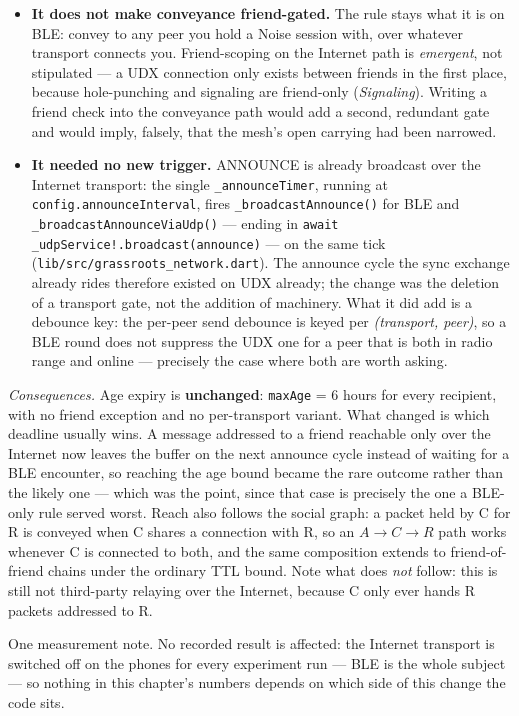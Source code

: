\documentclass[11pt]{report}
\newcommand{\code}[1]{\texttt{\small #1}}
\begin{document}
\begin{itemize}
  \item \textbf{It does not make conveyance friend-gated.} The rule stays what it is on BLE: convey to any peer you hold a Noise session with, over whatever transport connects you. Friend-scoping on the Internet path is \emph{emergent}, not stipulated --- a UDX connection only exists between friends in the first place, because hole-punching and signaling are friend-only (\emph{Signaling}). Writing a friend check into the conveyance path would add a second, redundant gate and would imply, falsely, that the mesh's open carrying had been narrowed.
  \item \textbf{It needed no new trigger.} ANNOUNCE is already broadcast over the Internet transport: the single \code{\_announceTimer}, running at \code{config.announceInterval}, fires \code{\_broadcastAnnounce()} for BLE and \code{\_broadcastAnnounceViaUdp()} --- ending in \code{await \_udpService!.broadcast(announce)} --- on the same tick (\code{lib/src/grassroots\_network.dart}). The announce cycle the sync exchange already rides therefore existed on UDX already; the change was the deletion of a transport gate, not the addition of machinery. What it did add is a debounce key: the per-peer send debounce is keyed per \emph{(transport, peer)}, so a BLE round does not suppress the UDX one for a peer that is both in radio range and online --- precisely the case where both are worth asking.
\end{itemize}

\emph{Consequences.} Age expiry is \textbf{unchanged}: \code{maxAge} = 6 hours for every recipient, with no friend exception and no per-transport variant. What changed is which deadline usually wins. A message addressed to a friend reachable only over the Internet now leaves the buffer on the next announce cycle instead of waiting for a BLE encounter, so reaching the age bound became the rare outcome rather than the likely one --- which was the point, since that case is precisely the one a BLE-only rule served worst. Reach also follows the social graph: a packet held by C for R is conveyed when C shares a connection with R, so an $A \rightarrow C \rightarrow R$ path works whenever C is connected to both, and the same composition extends to friend-of-friend chains under the ordinary TTL bound. Note what does \emph{not} follow: this is still not third-party relaying over the Internet, because C only ever hands R packets addressed to R.

One measurement note. No recorded result is affected: the Internet transport is switched off on the phones for every experiment run --- BLE is the whole subject --- so nothing in this chapter's numbers depends on which side of this change the code sits.
\end{document}
